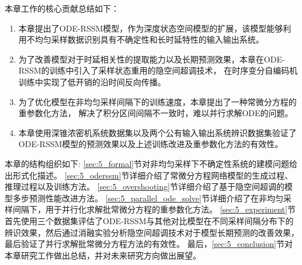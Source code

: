本章工作的核心贡献总结如下：
\begin{enumerate}
\item 本章提出了ODE-RSSM模型，作为深度状态空间模型的扩展，该模型能够利用不均匀采样数据识别具有不确定性和长时延特性的输入输出系统。
\item 为了改善模型对于时延相关性的提取能力以及长期预测效果，本章在ODE-RSSM的训练中引入了采样状态重用的隐空间超调技术，
在时序变分自编码机训练中实现了低开销的沿时间反向传播。
\item 为了优化模型在非均匀采样间隔下的训练速度，本章提出了一种常微分方程的重参数化方法，
解决了积分区间间隔不一致时，难以并行求解ODE的问题。
\item 本章使用深锥浓密机系统数据集以及两个公有输入输出系统辨识数据集验证了ODE-RSSM模型的预测效果以及上述训练改进及重参数化方法的有效性。
\end{enumerate}

本章的结构组织如下:
\ref{sec:5_formal}节对非均匀采样下不确定性系统的建模问题给出形式化描述。
\ref{sec:5_oderssm}节详细介绍了常微分方程网络模型的生成过程、推理过程以及训练方法。
\ref{sec:5_overshooting}节详细介绍了基于隐空间超调的模型多步预测性能改进方法。
\ref{sec:5_parallel_ode_solve}节详细介绍了在非均匀采样间隔下，用于并行化求解批常微分方程的重参数化方法。
\ref{sec:5_experiment}节首先使用三个数据集评估了ODE-RSSM与其他对比模型在不同采样间隔分布下的辨识效果，然后通过消融实验分析隐空间超调技术对于模型长期预测的改善效果，最后验证了并行求解批常微分方程方法的有效性。
最后，\ref{sec:5_conclusion}节对本章研究工作做出总结，并对未来研究方向做出展望。



